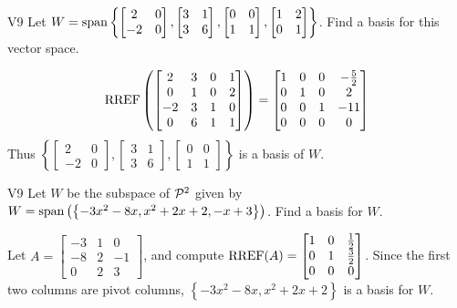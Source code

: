 \begin{problem}{V9}
Let \(
  W=\vspan\left\{
    \begin{bmatrix} 2 & 0 \\ -2 & 0 \end{bmatrix},
    \begin{bmatrix} 3 & 1 \\ 3 & 6 \end{bmatrix},
    \begin{bmatrix} 0 & 0 \\ 1 & 1 \end{bmatrix},
    \begin{bmatrix} 1 & 2 \\ 0 & 1 \end{bmatrix}
  \right\}
\). Find a basis for this vector space.
\end{problem}
\begin{solution}
\[
  \RREF\left(\begin{bmatrix}
    2 & 3 & 0 & 1 \\
    0 & 1 & 0 & 2 \\
    -2 & 3 & 1 & 0 \\
    0 & 6 & 1 & 1
  \end{bmatrix} \right) =
  \begin{bmatrix}
    1 & 0 & 0 & -\frac{5}{2} \\
    0 & 1 & 0 & 2 \\
    0 & 0 & 1 & -11\\
    0 & 0 & 0 & 0
  \end{bmatrix}
\]
Thus \(\left\{
  \begin{bmatrix} 2 & 0 \\ -2 & 0 \end{bmatrix},
  \begin{bmatrix} 3 & 1 \\ 3 & 6 \end{bmatrix},
  \begin{bmatrix} 0 & 0 \\ 1 & 1 \end{bmatrix}
\right\}\) is a basis of \(W\).
\end{solution}

\begin{problem}{V9}
Let \(W\) be the subspace of \(\P^2\) given by \(W = \vspan \left( \left\{  -3x^2-8x, x^2+2x+2, -x+3\right\} \right)\).   Find a basis for \(W\).
\end{problem}
\begin{solution}
Let \(A= \begin{bmatrix}-3 & 1 & 0 \\ -8 & 2 & -1 \\ 0 & 2 & 3\end{bmatrix}\), and compute \(\RREF(A) = \begin{bmatrix} 1 & 0 & \frac{1}{2} \\ 0 & 1 & \frac{3}{2} \\ 0 & 0 & 0 \end{bmatrix}\).
Since the first two columns are pivot columns, \(\left\{ -3x^2-8x, x^2+2x+2\right\} \) is a basis for \(W\).
\end{solution}
